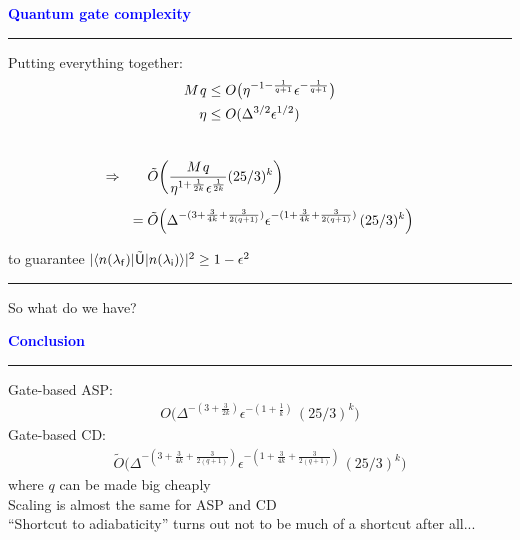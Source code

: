 \documentclass{beamer}
\def\lbt{} %
\def\mt#1{\kern0.025em\mathsf{#1}\kern0.025em}
\def\lambdai{{\lambda_{\sf i}}}
\def\lambdaf{{\lambda_{\sf f}}}
\def\>{\kern0.08em}
\newenvironment{dia}[2]
{
	\begin{frame}
	\vspace{1mm}
	{\small #1}
	\hfill
    {\small\bf\textcolor{blue}{#2}}
	\vspace{3mm}
	\hrule
	\bigskip
}
{
	\vfill
	\end{frame}
}
\begin{document}
\begin{dia}{\lbt}{Quantum gate complexity}
Putting everything together:
\begin{align*}
    M \> q &\leq O\big( \eta^{-1 - \frac1{q + 1}} \epsilon^{-\frac1{q + 1}} \big) \nonumber \\
    \eta &\leq O(\Delta^{3/2}\epsilon^{1/2})
\end{align*}
$ $\\[-8mm] \pause
\begin{align*}
    \Rightarrow \quad\quad &\tilde O\bigg( \frac{M \> q}{\eta^{1 + \frac1{2k}}\epsilon^{\frac1{2k}}} (25/3)^k \bigg) \nonumber \\[2mm]
    = {} &\tilde O\Big( \Delta^{-(3 + \frac3{4k} + \frac3{2(q + 1)})} \epsilon^{-(1 + \frac3{4k} + \frac3{2(q + 1)})} \, (25/3)^k \Big)
\end{align*}

to guarantee $|\bra{n(\lambdaf)} \tilde{\mt U} \ket{n(\lambdai)}|^2 \geq 1 - \epsilon^2$
\vspace{-0.2cm}
\end{dia}

\begin{dia}{\lbt}{}
\vspace{2.5cm}
\begin{center}
\begin{LARGE}
\textcolor{mygreen}{So what do we have?}
\end{LARGE}
\end{center}
\vspace*{1.5cm}
\end{dia}

\begin{dia}{\lbt}{Conclusion}
Gate-based ASP:
\begin{align*}
    O\Big( \Delta^{-(3 + \frac3{2k})} \epsilon^{-(1 + \frac1k)} \, (25/3)^k \Big)
\end{align*}
\pause Gate-based CD:
\begin{align*}
    \tilde O\Big( \Delta^{-(3 + \frac3{4k} + \frac3{2(q + 1)})} \epsilon^{-(1 + \frac3{4k} + \frac3{2(q + 1)})} \, (25/3)^k \Big)
\end{align*}
where $q$ can be made big cheaply \\[5mm] \pause
Scaling is almost the same for ASP and CD \\[5mm] \pause
``Shortcut to adiabaticity'' turns out not to be much of a shortcut after all...
\vspace{-0.6cm}
\end{dia}
\end{document}
